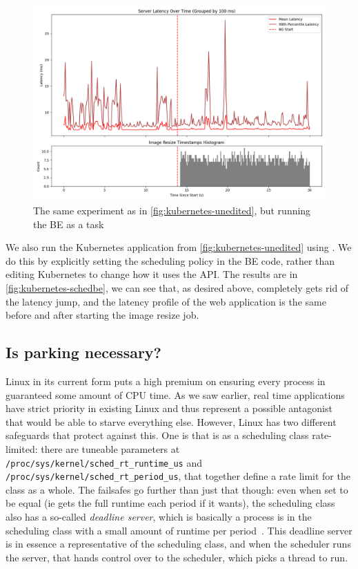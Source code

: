 \begin{figure}[t]
    \centering
    \includegraphics[width=\columnwidth]{graphs/kubernetes-schedbe.png}
    \caption{The same experiment as in \autoref{fig:kubernetes-unedited}, but
    running the BE as a \schedbe{} task}\label{fig:kubernetes-schedbe}
\end{figure}

We also run the Kubernetes application from \autoref{fig:kubernetes-unedited}
using \schedbe{}. We do this by explicitly setting the scheduling policy in the
BE code, rather than editing Kubernetes to change how it uses the \cgroups{}
API. The results are in \autoref{fig:kubernetes-schedbe}, we can see that, as
desired above, \schedbe{} completely gets rid of the latency jump, and the
latency profile of the web application is the same before and after starting the
image resize job.


\subsection{Is parking necessary?}\label{ss:eval:parking}

Linux in its current form puts a high premium on ensuring every process in
guaranteed some amount of CPU time. As we saw earlier, real time applications
have strict priority in existing Linux and thus represent a possible antagonist
that would be able to starve everything else. However, Linux has two different
safeguards that protect against this. One is that \fifoclass{} is as a
scheduling class rate-limited: there are tuneable parameters at
\texttt{/proc/sys/kernel/sched\_rt\_runtime\_us} and
\texttt{/proc/sys/kernel/sched\_rt\_period\_us}, that together define a rate
limit for the \fifoclass{} class as a whole. The failsafes go further than just
that though: even when set to be equal (ie \fifoclass{} gets the full runtime
each period if it wants), the \normalclass{} scheduling class also has a
so-called \textit{deadline server}, which is basically a process is in the
\deadlineclass{} scheduling class with a small amount of runtime per
period~\cite{lkml-deadline-srv}. This deadline server is in essence a
representative of the \normalclass{} scheduling class, and when the
\deadlineclass{} scheduler runs the server, that hands control over to the
\normalclass{} scheduler, which picks a thread to run.


